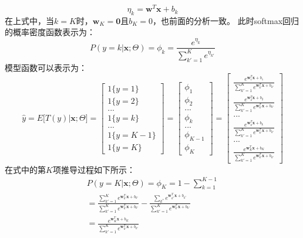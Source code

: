 \documentclass[UTF8]{article}
\begin{document}
\begin{equation}
\eta _{k} = \boldsymbol{w}^{T}\boldsymbol{x} + b_{k}
\label{lcrn-softmax-regression-eta-deduction-5}
\end{equation}
在上式中，当$k=K$时，$\boldsymbol{w}_{K} = \boldsymbol{0}$且$b_{K}=0$，也前面的分析一致。
此时softmax回归的概率密度函数表示为：
\begin{equation}
P(y=k \vert \boldsymbol{x}; \Theta) = \phi _{k} = \frac{e^{\eta _{k}}}{\sum_{k'=1}^{K} e^{\eta _{k'}}}
\label{lcrn-softmax-regression-prop-p}
\end{equation}
模型函数可以表示为：
\begin{equation}
\hat{y} = E \Big[ T(y) \vert \boldsymbol{x}; \Theta \Big] = \begin{bmatrix}
1\{y=1\} \\
1\{y=2\} \\
... \\
1\{y=k\} \\
... \\
1\{y=K-1\} \\
1\{y=K\}
\end{bmatrix} = \begin{bmatrix}
\phi _{1} \\
\phi _{2} \\
... \\
\phi _{k} \\
... \\
\phi _{K-1} \\
\phi _{K}
\end{bmatrix} = \begin{bmatrix}
\frac{e^{\boldsymbol{w}_{1}^{T}\boldsymbol{x} + b_{1}}}{\sum_{k'=1}^{K} e^{\boldsymbol{w}_{k'}^{T}\boldsymbol{x} + b_{k'}} } \\
\frac{e^{\boldsymbol{w}_{2}^{T}\boldsymbol{x} + b_{2}}}{\sum_{k'=1}^{K} e^{\boldsymbol{w}_{k'}^{T}\boldsymbol{x} + b_{k'}} } \\
... \\
\frac{e^{\boldsymbol{w}_{k}^{T}\boldsymbol{x} + b_{k}}}{\sum_{k'=1}^{K} e^{\boldsymbol{w}_{k'}^{T}\boldsymbol{x} + b_{k'}} } \\
... \\
\frac{e^{\boldsymbol{w}_{K}^{T}\boldsymbol{x} + b_{K}}}{\sum_{k'=1}^{K} e^{\boldsymbol{w}_{k'}^{T}\boldsymbol{x} + b_{k'}} }
\end{bmatrix}
\label{lcrn-softmax-regression-yhat}
\end{equation}
在式中的第$K$项推导过程如下所示：
\begin{equation}
\begin{aligned}
P(y=K \vert \boldsymbol{x}; \Theta) = \phi _{K} = 1 - \sum_{k=1}^{K-1} \\
= \frac{\sum_{k'=1}^{K} e^{\boldsymbol{w}_{k'}^{T}\boldsymbol{x} + b_{k'}}}{\sum_{k'=1}^{K} e^{\boldsymbol{w}_{k'}^{T}\boldsymbol{x} + b_{k'}} } - \frac{\sum_{k^{*}}e^{\boldsymbol{w}_{k^{*}}^{T}\boldsymbol{x} + b_{k^{*}}}}{\sum_{k'=1}^{K} e^{\boldsymbol{w}_{k'}^{T}\boldsymbol{x} + b_{k'}} } \\
= \frac{e^{\boldsymbol{w}_{K}^{T}\boldsymbol{x} + b_{K}}}{\sum_{k'=1}^{K} e^{\boldsymbol{w}_{k'}^{T}\boldsymbol{x} + b_{k'}} }
\end{aligned}
\label{lcrn-softmax-regression-item-K}
\end{equation}
\end{document}
